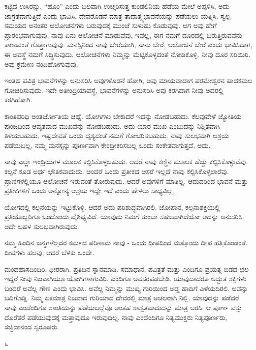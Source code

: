 ಕಟ್ಟಿದ ಉಸಿರನ್ನು, “ಹೂಂ” ಎಂದು ಬಲವಾಗಿ ಉಚ್ಚರಿಸುತ್ತ ಕುಂಡಲಿನಿಯ ಹೆಡೆಯ ಮೇಲೆ ಅಪ್ಪಳಿಸಿ, ಅದು ಜಾಗ್ರತವಾಗುತ್ತಿದೆ ಎಂದು ಭಾವಿಸಿ. ದೇವರೊಡನೆ ಮಾತ್ರ ತಾದಾತ್ಮ್ಯಭಾವನೆಯನ್ನು ಪಡೆಯಲು ಯತ್ನಿಸಿ. ಸ್ವಲ್ಪ ಸಮಯದ ಅನಂತರ ಆಲೋಚನೆಗಳು ಬರುವುದಕ್ಕೆ ಮುಂಚೆ ಸುಳುಹು ಕೊಡುವುವು. ಆಗ ಅವು ಹೇಗೆ ಪ್ರಾರಂಭವಾಗುವುವು, ನಾವು ಏನು ಆಲೋಚನೆ ಮಾಡುವೆವು, ಇವೆಲ್ಲ, ಈಗ ನಮಗೆ ದೂರದಲ್ಲಿ ಬರುತ್ತಿರುವವನು ಕಾಣುವಂತೆ ಗೊತ್ತಾಗುವುವು. ಮನಸ್ಸಿನಿಂದ ನಾವು ಬೇರೆಯಾಗಿ, ನಾನು ಬೇರೆ, ಆಲೋಚನೆ ಬೇರೆ ಎಂದು ಭಾವಿಸಿದಾಗ, ಈ ಅವಸ್ಥೆ ನಮಗೆ ಸಿದ್ಧಿಸುವುದು. ಆಲೋಚನೆಗಳು ನಿಮ್ಮನ್ನು ಮೆಟ್ಟಿಕೊಳ್ಳದಂತೆ ನೋಡಿಕೊಳ್ಳಿ. ನೀವು ದೂರ ಸರಿಯಿರಿ. ಅವು ಕ್ರಮೇಣ ನಂದಿಹೋಗುವುವು.

ಇಂತಹ ಪವಿತ್ರ ಭಾವನೆಗಳನ್ನು ಅನುಸರಿಸಿ ಅವುಗಳೊಡನೆ ಹೋಗಿ, ಅವು ಮಾಯವಾದಾಗ ಪರಮೇಶ್ವರನ ಪಾದಕಮಲ ಗೋಚರಿಸುವುದು. ಇದೇ ಅತೀಂದ್ರಿಯಾವಸ್ಥೆ, ಭಾವನೆಗಳನ್ನು ಅನುಸರಿಸಿ ಅವು ಕರಗಿದಾಗ ನೀವು ಅದರಲ್ಲಿ ಕರಗಿಹೋಗಿ.

ಕಾಂತಿಪರಿಧಿ ಅಂತರ್ಜೋತಿಯ ಚಿಹ್ನೆ. ಯೋಗಿಗಳು ಬೇಕಾದರೆ ಇದನ್ನು ನೋಡಬಹುದು. ಕೆಲವುವೇಳೆ ಜ್ಯೋತಿಯ ಪುಂಜದಿಂದ ಆವೃತವಾದ ಮುಖವನ್ನು ನೋಡಬಹುದು. ಅದು ಯಾರ ಮುಖ ಎಂಬುದನ್ನು ನಿಶ್ಚಿತವಾಗಿ ತಿಳಿಯಬಹುದು. ಇಷ್ಟದೇವತೆ ಒಂದು ದೃಶ್ಯದಂತೆ ನಮಗೆ ಗೋಚರಿಸಬಹುದು. ನಾವು ಸುಲಭವಾಗಿ ಆಶ್ರಯ ಪಡೆಯಬಲ್ಲ, ನಮ್ಮ ಮನಸ್ಸನ್ನು ಪೂರ್ಣವಾಗಿ ಕೇಂದ್ರೀಕರಿಸಬಲ್ಲ ಒಂದು ಸಂಕೇತವಾಗುತ್ತದೆ, ಅದು.

ನಾವು ಎಲ್ಲಾ ಇಂದ್ರಿಯಗಳ ಮೂಲಕ ಕಲ್ಪಿಸಿಕೊಳ್ಳಬಹುದು. ಆದರೆ ನಾವು ಕಣ್ಣಿನ ಮೂಲಕ ಹೆಚ್ಚು ಕಲ್ಪಿಸಿಕೊಳ್ಳುವೆವು. ಕಲ್ಪನೆ ಕೂಡ ಅರ್ಧ ಭೌತಿಕವಾದುದು. ಅಂದರೆ ಒಂದು ಪ್ರತೀಕದ ಆಸರೆ ಇಲ್ಲದೆ ನಾವು ಕಲ್ಪಿಸಿಕೊಳ್ಳಲಾರೆವು. ಪ್ರಾಣಿಗಳಲ್ಲಿಯೂ ಆಲೋಚನೆ ಇರುವಂತೆ ತೋರುವುದು. ಆದರೆ ಅವುಗಳಿಗೆ ಮಾತಿಲ್ಲ. ಆದುದರಿಂದ ಭಾವನೆ ಮತ್ತು ಪ್ರತೀಕಗಳಿಗೆ ಒಂದು ಅನ್ನೋನ್ಯ ಆಶ್ರಯ ಇದ್ದೇ ಇದೆ ಎಂದು ಹೇಳಲು ಸಾಧ್ಯವಿಲ್ಲ.

ಯೋಗದಲ್ಲಿ ಕಲ್ಪನೆಯನ್ನು ಇಟ್ಟುಕೊಳ್ಳಿ. ಆದರೆ ಅದು ಪರಿಶುದ್ಧವಾಗಿರಲಿ. ಜೋಪಾನ, ಕಲ್ಪನಾಶಕ್ತಿಯಲ್ಲಿ ಪ್ರತಿಯೊಬ್ಬರಿಗೂ ಒಂದೊಂದು ವೈಶಿಷ್ಟ್ಯವಿದೆ. ಯಾವುದು ನಿಮಗೆ ತುಂಬಾ ಸಹಜವಾಗಿದೆಯೋ ಅದನ್ನು ಅನುಸರಿಸಿ. ಅದೇ ಬಹಳ ಸುಲಭವಾಗಿರುವುದು.

ನಮ್ಮ ಹಿಂದಿನ ಜನ್ಮಗಳೆಲ್ಲದರ ಕರ್ಮದ ಪರಿಣಾಮ ನಾವು - ಒಂದು ದೀಪದಿಂದ ಮತ್ತೊಂದು ದೀಪ ಹತ್ತಿಕೊಂಡಂತೆ. ದೀಪಗಳು ಹಲವು, ಆದರೆ ಬೆಳಕು ಒಂದೇ.

ಮಂದಹಾಸದಿಂದಿರಿ, ಧೀರರಾಗಿ. ಪ್ರತಿದಿನ ಸ್ನಾನಮಾಡಿ. ಸಮಾಧಾನ, ಪವಿತ್ರತೆ ಮತ್ತು ಎಂದಿಗೂ ಪ್ರಯತ್ನ ಬಿಡದ ಛಲ ಇದ್ದರೆ ನೀವು ನಿಜವಾಗಿಯೂ ಯೋಗಿಗಳಾಗುವಿರಿ. ಎಂದಿಗೂ ಅವಸರಪಡಬೇಡಿ. ಯಾವುದಾದರೂ ಅದ್ಭುತ ಶಕ್ತಿಗಳು ಬಂದರೆ ಅವೆಲ್ಲ ಗೌಣ ಎಂದು ಭಾವಿಸಿ. ಅವೆಲ್ಲ ನಿಮ್ಮನ್ನು ಮುಖ್ಯ ಗುರಿಯಿಂದ ಅಡ್ಡ ಹಾದಿಗೆ ಎಳೆಯದಿರಲಿ. ಅವನ್ನು ಬದಿಗೊಡ್ಡಿ. ನಿಮ್ಮ ಏಕಮಾತ್ರ ನಿಜವಾದ ಗುರಿಯಾದ ದೇವರಲ್ಲಿ ಮಾತ್ರ ಅಚಲರಾಗಿ ನಿಲ್ಲಿ. ಯಾವುದನ್ನು ಪಡೆದರೆ ನಾವು ಎಂದೆಂದಿಗೂ ಶಾಂತಿಯನ್ನು ಪಡೆಯಬಲ್ಲೆವೊ ಅಂತಹ ಶಾಶ್ವತವಾದುದನ್ನು ಮಾತ್ರ ಅರಸಿ, ಆ ಪೂರ್ಣ ವಸ್ತು ದೊರೆತರೆ ಪಡೆಯುವುದಕ್ಕೆ ಮತ್ತಾವುದೂ ಇರುವುದಿಲ್ಲ. ನಾವು ಎಂದೆಂದಿಗೂ ನಿತ್ಯಮುಕ್ತರು ನಿತ್ಯಪೂರ್ಣರು, ಸಚ್ಚಿದಾನಂದ ಸ್ವರೂಪರು.

\begin{center}
೬
\end{center}

